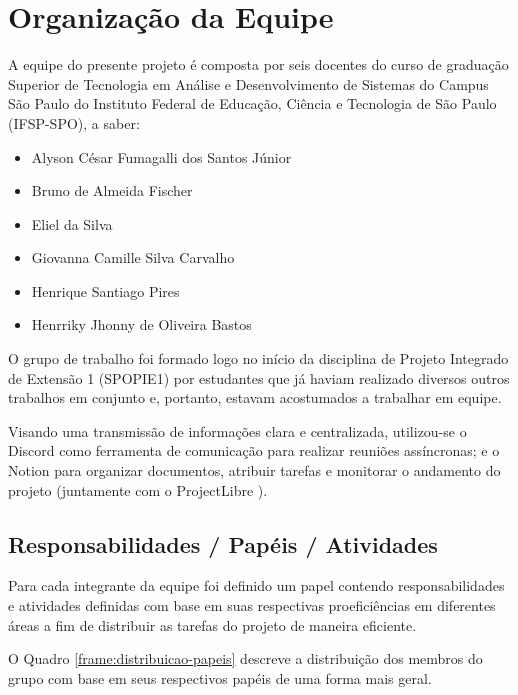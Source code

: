 \section{Organização da Equipe}

A equipe do presente projeto é composta por seis docentes do curso de graduação Superior de Tecnologia em Análise e Desenvolvimento de Sistemas do Campus São Paulo do Instituto Federal de Educação, Ciência e Tecnologia de São Paulo (IFSP-SPO), a saber:

\begin{itemize}
	\item Alyson César Fumagalli dos Santos Júnior
	\item Bruno de Almeida Fischer
	\item Eliel da Silva
	\item Giovanna Camille Silva Carvalho
	\item Henrique Santiago Pires
	\item Henrriky Jhonny de Oliveira Bastos
\end{itemize}

O grupo de trabalho foi formado logo no início da disciplina de Projeto Integrado de Extensão 1 (SPOPIE1) por estudantes que já haviam realizado diversos outros trabalhos em conjunto e, portanto, estavam acostumados a trabalhar em equipe.

Visando uma transmissão de informações clara e centralizada, utilizou-se o Discord \cite{discord-2025} como ferramenta de comunicação para realizar reuniões assíncronas; e o Notion \cite{notion-2025} para organizar documentos, atribuir tarefas e monitorar o andamento do projeto (juntamente com o ProjectLibre \cite{projectlibre-2025}).

\subsection{Responsabilidades / Papéis / Atividades}

Para cada integrante da equipe foi definido um papel contendo responsabilidades e atividades definidas com base em suas respectivas proeficiências em diferentes áreas a fim de distribuir as tarefas do projeto de maneira eficiente.

O Quadro \ref{frame:distribuicao-papeis} descreve a distribuição dos membros do grupo com base em seus respectivos papéis de uma forma mais geral.

